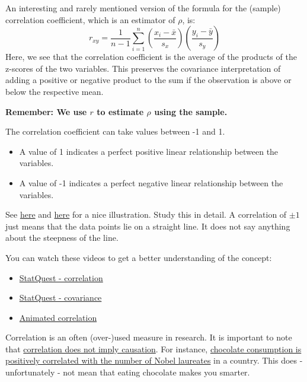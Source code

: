 \documentclass[
]{book}
\begin{document}
An interesting and rarely mentioned version of the formula for the (sample) correlation coefficient, which is an estimator of \(\rho\), is:
\[ r_{xy} = \frac{1}{n-1} \sum_{i=1}^{n} \left( \frac{x_i - \bar{x}}{s_x} \right) \left( \frac{y_i - \bar{y}}{s_y} \right) \]
Here, we see that the correlation coefficient is the average of the products of the z-scores of the two variables.
This preserves the covariance interpretation of adding a positive or negative product to the sum if the observation is above or below the respective mean.

\textbf{Remember: We use \(r\) to estimate \(\rho\) using the sample.}

The correlation coefficient can take values between -1 and 1.

\begin{itemize}
\item
  A value of 1 indicates a perfect positive linear relationship between the variables.
\item
  A value of -1 indicates a perfect negative linear relationship between the variables.
\end{itemize}

See \href{https://en.wikipedia.org/wiki/Correlation\#/media/File:Correlation_examples2.svg}{here} and
\href{https://en.wikipedia.org/wiki/Correlation\#/media/File:Pearson_Correlation_Coefficient_and_associated_scatterplots.png}{here}
for a nice illustration. Study this in detail. A correlation of \(\pm 1\) just means that the data points lie on a straight line.
It does not say anything about the steepness of the line.

You can watch these videos to get a better understanding of the concept:

\begin{itemize}
\item
  \href{https://www.youtube.com/watch?v=xZ_z8KWkhXE&ab_channel=StatQuestwithJoshStarmer}{StatQuest - correlation}
\item
  \href{https://www.youtube.com/watch?v=qtaqvPAeEJY&ab_channel=StatQuestwithJoshStarmer}{StatQuest - covariance}
\item
  \href{https://www.youtube.com/watch?v=rijqfllOq6g&ab_channel=3-MinuteDataScience}{Animated correlation}
\end{itemize}

Correlation is an often (over-)used measure in research.
It is important to note that
\href{https://en.wikipedia.org/wiki/Correlation_does_not_imply_causation}{correlation does not imply causation}.
For instance,
\href{https://www.sciencedirect.com/science/article/pii/S2590291120300711}{chocolate consumption is positively correlated with the number of Nobel laureates} in a country.
This does - unfortunately - not mean that eating chocolate makes you smarter.
\end{document}
